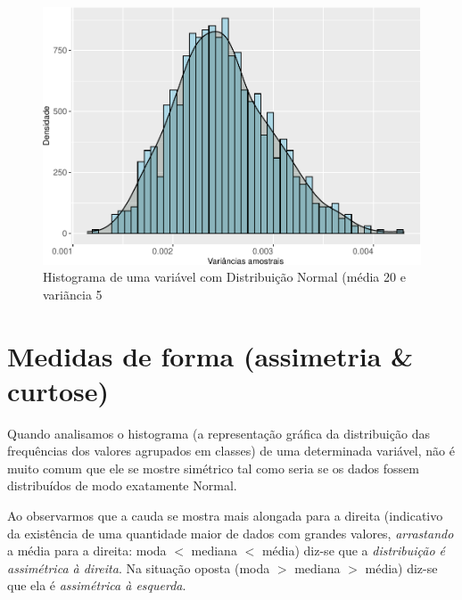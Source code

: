 \documentclass[
]{book}
\begin{document}
\begin{figure}

{\centering \includegraphics{apostila_files/figure-latex/unnamed-chunk-36-1} 

}

\caption{Histograma de uma variável com Distribuição Normal (média 20 e variãncia 5}\label{fig:unnamed-chunk-36}
\end{figure}

\hypertarget{medidas-de-forma-assimetria-curtose}{%
\section{Medidas de forma (assimetria \& curtose)}\label{medidas-de-forma-assimetria-curtose}}

\hfill\break

Quando analisamos o histograma (a representação gráfica da distribuição das frequências dos valores agrupados em classes) de uma determinada variável, não é muito comum que ele se mostre simétrico tal como seria se os dados fossem distribuídos de modo exatamente Normal.

\hfill\break

Ao observarmos que a cauda se mostra mais alongada para a direita (indicativo da existência de uma quantidade maior de dados com grandes valores, \emph{arrastando} a média para a direita: moda \(<\) mediana \(<\) média) diz-se que a \emph{distribuição é assimétrica à direita}. Na situação oposta (moda \(>\) mediana \(>\) média) diz-se que ela é \emph{assimétrica à esquerda}.

\hfill\break
\end{document}

